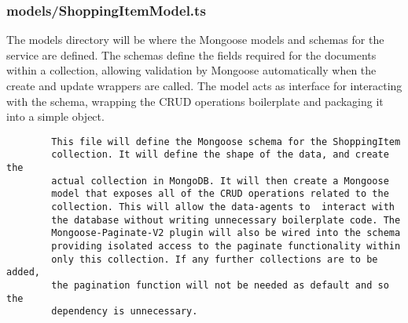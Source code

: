 \subsubsection{models/ShoppingItemModel.ts}
The models directory will be where the Mongoose models and schemas for the service are defined. The schemas define the fields required for the documents within a collection, allowing validation by Mongoose automatically when the create and update wrappers are called. The model acts as interface for interacting with the schema, wrapping the CRUD operations boilerplate and packaging it into a simple object.  
\begin{verbatim}
        This file will define the Mongoose schema for the ShoppingItem 
        collection. It will define the shape of the data, and create the
        actual collection in MongoDB. It will then create a Mongoose 
        model that exposes all of the CRUD operations related to the 
        collection. This will allow the data-agents to  interact with
        the database without writing unnecessary boilerplate code. The
        Mongoose-Paginate-V2 plugin will also be wired into the schema 
        providing isolated access to the paginate functionality within
        only this collection. If any further collections are to be added,
        the pagination function will not be needed as default and so the
        dependency is unnecessary.
\end{verbatim}
